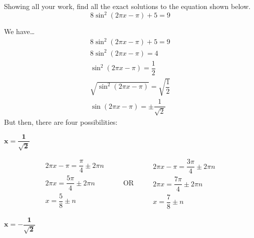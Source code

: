 \documentclass[12pt,letterpaper]{exam}
\begin{document}
\begin{questions}
\newpage
\question[15] Showing all your work, find all the exact solutions to the equation shown below. 
	\[
	8 \sin^2(2 \pi x - \pi) + 5= 9
	\] \pspace

\sol We have\dots
	\[
	\begin{gathered}
	8 \sin^2(2 \pi x - \pi) + 5= 9 \\[0.1cm]
	8 \sin^2(2 \pi x - \pi)= 4 \\[0.1cm]
	\sin^2(2 \pi x - \pi)= \dfrac{1}{2} \\[0.1cm]
	\sqrt{\sin^2(2 \pi x - \pi)}= \sqrt{\dfrac{1}{2}} \\[0.1cm]
	\sin(2\pi x - \pi)= \pm \dfrac{1}{\sqrt{2}}
	\end{gathered}
	\]
But then, there are four possibilities:
	
	\begin{center} \underline{\phantom{XXX}$\mathbf{x= \dfrac{1}{\sqrt{2}}}$\phantom{XXX}} \end{center}
	
	\[
	\begin{gathered}
	2\pi x - \pi= \dfrac{\pi}{4} \pm 2 \pi n \\[0.1cm]
	2\pi x= \dfrac{5\pi}{4} \pm 2 \pi n \\[0.1cm]
	\boxed{x= \dfrac{5}{8} \pm n}
	\end{gathered}
	\qquad \text{ OR } \qquad
	\begin{gathered}
	2\pi x - \pi= \dfrac{3\pi}{4} \pm 2 \pi n \\[0.1cm]
	2\pi x= \dfrac{7\pi}{4} \pm 2 \pi n \\[0.1cm]
	\boxed{x= \dfrac{7}{8} \pm n}
	\end{gathered}
	\]
	
	\begin{center} \underline{\phantom{XXX}$\mathbf{x= -\dfrac{1}{\sqrt{2}}}$\phantom{XXX}} \end{center}


\end{questions}
\end{document}
